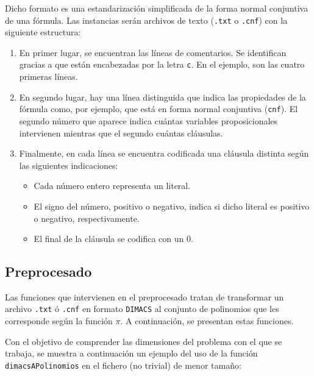 Dicho formato es una estandarización simplificada de la forma normal conjuntiva de una fórmula. Las instancias serán archivos de texto (\texttt{.txt} o \texttt{.cnf}) con la siguiente estructura:

\begin{enumerate}
\item En primer lugar, se encuentran las líneas de comentarios. Se identifican gracias a que están encabezadas por la letra \texttt{c}. En el ejemplo, son las cuatro primeras líneas.
\item En segundo lugar, hay una línea distinguida que indica las propiedades de la fórmula como, por ejemplo, que está en forma normal conjuntiva (\texttt{cnf}). El segundo número que aparece indica cuántas variables proposicionales intervienen mientras que el segundo cuántas cláusulas.
\item Finalmente, en cada línea se encuentra codificada una cláusula distinta según las siguientes indicaciones:
\begin{itemize}
\item Cada número entero representa un literal.
\item El signo del número, positivo o negativo, indica si dicho literal es positivo o negativo, respectivamente.
\item El final de la cláusula se codifica con un 0.
\end{itemize} 
\end{enumerate}

\subsection{Preprocesado}

Las funciones que intervienen en el preprocesado tratan de transformar un archivo \texttt{.txt} ó \texttt{.cnf} en formato \texttt{DIMACS} al conjunto de polinomios que les corresponde según la función $\pi$. A continuación, se presentan estas funciones.


Con el objetivo de comprender las dimensiones del problema con el que se trabaja, se muestra a continuación un ejemplo del uso de la función \texttt{dimacsAPolinomios} en el fichero (no trivial) de menor tamaño:

